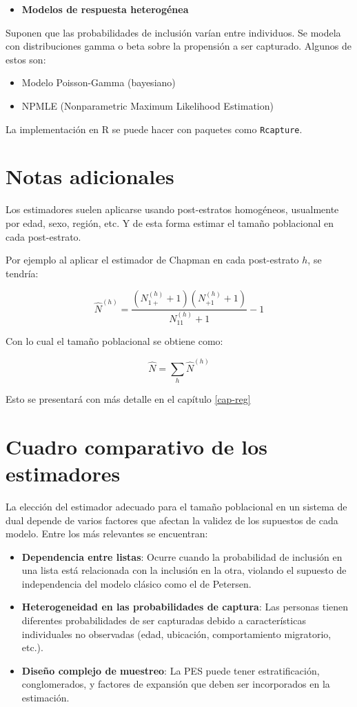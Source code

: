 \documentclass[
  12pt,
]{book}
\providecommand{\tightlist}{%
  \setlength{\itemsep}{0pt}\setlength{\parskip}{0pt}}
\begin{document}
\begin{itemize}
\tightlist
\item
  \textbf{Modelos de respuesta heterogénea}
\end{itemize}

Suponen que las probabilidades de inclusión varían entre individuos. Se modela con distribuciones gamma o beta sobre la propensión a ser capturado. Algunos de estos son:

\begin{itemize}
\tightlist
\item
  Modelo Poisson-Gamma (bayesiano)
\item
  NPMLE (Nonparametric Maximum Likelihood Estimation)
\end{itemize}

La implementación en R se puede hacer con paquetes como \texttt{Rcapture}.

\section{Notas adicionales}\label{notas-adicionales}

Los estimadores suelen aplicarse usando post-estratos homogéneos, usualmente por edad, sexo, región, etc. Y de esta forma estimar el tamaño poblacional en cada post-estrato.

Por ejemplo al aplicar el estimador de Chapman en cada post-estrato \(h\), se tendría:

\[\hat{N}^{(h)} = \frac{(N_{1+}^{(h)} + 1)(N_{+1}^{(h)} + 1)}{N_{11}^{(h)} + 1} - 1\]

Con lo cual el tamaño poblacional se obtiene como:

\[\hat{N} = \sum_{h} \hat{N}^{(h)}\]

Esto se presentará con más detalle en el capítulo \ref{cap-reg}

\section{Cuadro comparativo de los estimadores}\label{cuadro-comparativo-de-los-estimadores}

La elección del estimador adecuado para el tamaño poblacional en un sistema de dual depende de varios factores que afectan la validez de los supuestos de cada modelo. Entre los más relevantes se encuentran:

\begin{itemize}
\tightlist
\item
  \textbf{Dependencia entre listas}: Ocurre cuando la probabilidad de inclusión en una lista está relacionada con la inclusión en la otra, violando el supuesto de independencia del modelo clásico como el de Petersen.
\item
  \textbf{Heterogeneidad en las probabilidades de captura}: Las personas tienen diferentes probabilidades de ser capturadas debido a características individuales no observadas (edad, ubicación, comportamiento migratorio, etc.).
\item
  \textbf{Diseño complejo de muestreo}: La PES puede tener estratificación, conglomerados, y factores de expansión que deben ser incorporados en la estimación.
\end{itemize}
\end{document}
